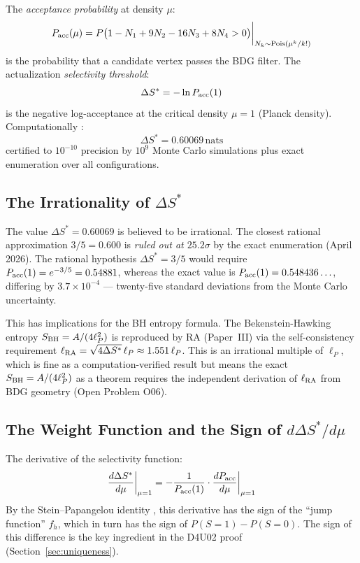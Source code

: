 \documentclass[12pt,a4paper]{article}
\begin{document}
The \emph{acceptance probability} at density $\mu$:
\begin{equation}
  P_{\rm acc}(\mu) = P\bigl(1 - N_1 + 9N_2 - 16N_3 + 8N_4 > 0\bigr)\biggr|_{N_k\sim{\rm Pois}(\mu^k/k!)}
  \label{eq:Pacc}
\end{equation}
is the probability that a candidate vertex passes the BDG filter.  The actualization \emph{selectivity threshold}:
\begin{equation}
  \Delta S^* = -\ln P_{\rm acc}(1)
  \label{eq:dSstar_def}
\end{equation}
is the negative log-acceptance at the critical density $\mu=1$ (Planck density).  Computationally \statusCV:
\begin{equation}
  \Delta S^* = 0.60069\,\mathrm{nats}
  \label{eq:dSstar_val}
\end{equation}
certified to $10^{-10}$ precision by $10^9$ Monte Carlo simulations plus exact enumeration over all configurations.

\subsection{The Irrationality of $\Delta S^*$}

The value $\Delta S^*=0.60069$ is believed to be irrational.  The closest rational approximation $3/5=0.600$ is \emph{ruled out at $25.2\sigma$} by the exact enumeration (April 2026).  The rational hypothesis $\Delta S^*=3/5$ would require $P_{\rm acc}(1)=e^{-3/5}=0.54881$, whereas the exact value is $P_{\rm acc}(1)=0.548436\ldots$, differing by $3.7\times10^{-4}$ --- twenty-five standard deviations from the Monte Carlo uncertainty.

This has implications for the BH entropy formula.  The Bekenstein-Hawking entropy $S_{\rm BH}=A/(4\ell_P^2)$ is reproduced by RA (Paper~III) via the self-consistency requirement $\ell_{\rm RA}=\sqrt{4\Delta S^*}\,\ell_P\approx1.551\,\ell_P$.  This is an irrational multiple of $\ell_P$, which is fine as a computation-verified result but means the exact $S_{\rm BH}=A/(4\ell_P^2)$ as a theorem requires the independent derivation of $\ell_{\rm RA}$ from BDG geometry (Open Problem O06).

\subsection{The Weight Function and the Sign of $d\Delta S^*/d\mu$}

The derivative of the selectivity function:
\begin{equation}
  \frac{d\Delta S^*}{d\mu}\biggr|_{\mu=1} = -\frac{1}{P_{\rm acc}(1)}\cdot\frac{dP_{\rm acc}}{d\mu}\biggr|_{\mu=1}
  \label{eq:dDeltaS}
\end{equation}
By the Stein--Papangelou identity \cite{Stein1972}, this derivative has the sign of the ``jump function'' $f_h$, which in turn has the sign of $P(S=1)-P(S=0)$.  The sign of this difference is the key ingredient in the D4U02 proof (Section~\ref{sec:uniqueness}).
\end{document}
